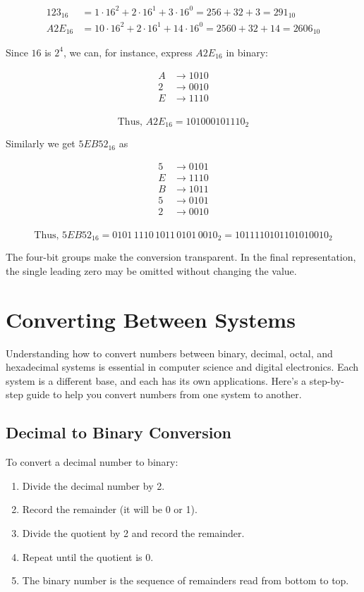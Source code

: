 \[
\begin{aligned}
123_{16} &= 1 \cdot 16^2 + 2 \cdot 16^1 + 3 \cdot 16^0  = 256 + 32 + 3 = 291_{10} \\
A2E_{16} & = 10 \cdot 16^2 + 2 \cdot 16^1 + 14 \cdot 16^0 = 2560 + 32 + 14 = 2606_{10}
\end{aligned}
\]

Since \(16\) is \(2^4\), we can, for instance, express $A2E_{16}$ in binary:

\[
\begin{aligned}
A & \rightarrow 1010 \\
2 & \rightarrow 0010 \\
E & \rightarrow 1110 \\
\end{aligned}
\]

\[
\text{Thus, } A2E_{16} = 101000101110_2
\]

Similarly we get $5EB52_{16}$ as

\[
\begin{aligned}
5 & \rightarrow 0101 \\
E & \rightarrow 1110 \\
B & \rightarrow 1011 \\
5 & \rightarrow 0101 \\
2 & \rightarrow 0010 \\
\end{aligned}
\]

\[
\text{Thus, } 5EB52_{16} = 0101\,1110\,1011\,0101\,0010_2 = 1011110101101010010_2
\]

The four-bit groups make the conversion transparent. In the final representation, the single leading zero may be omitted without changing the value.

\section{Converting Between Systems}

Understanding how to convert numbers between binary, decimal, octal, and hexadecimal systems is essential in computer science and digital electronics. Each system is a different base, and each has its own applications. Here's a step-by-step guide to help you convert numbers from one system to another.

\subsection*{Decimal to Binary Conversion}
To convert a decimal number to binary:
\begin{enumerate}
    \item Divide the decimal number by 2.
    \item Record the remainder (it will be 0 or 1).
    \item Divide the quotient by 2 and record the remainder.
    \item Repeat until the quotient is 0.
    \item The binary number is the sequence of remainders read from bottom to top.
\end{enumerate}

